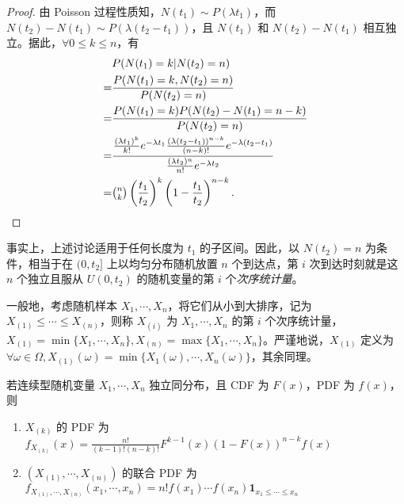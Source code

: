 \documentclass[../main.tex]{subfiles}
\begin{document}
\begin{proof}
    由 Poisson 过程性质知，$N(t_1)\sim P(\lambda t_1)$，而 $N(t_2)-N(t_1)\sim P(\lambda(t_2-t_1))$，且 $N(t_1)$ 和 $N(t_2)-N(t_1)$ 相互独立。据此，$\forall0\leq k\leq n$，有
    \begin{equation*}
        \begin{aligned}
              & P(N(t_1)=k|N(t_2)=n)                                                                                                                                      \\
            = & \frac{P(N(t_1)=k,N(t_2)=n)}{P(N(t_2)=n)}                                                                                                                  \\
            = & \frac{P(N(t_1)=k)P(N(t_2)-N(t_1)=n-k)}{P(N(t_2)=n)}                                                                                                       \\
            = & \frac{\frac{(\lambda t_1)^k}{k!}e^{-\lambda t_1}\frac{(\lambda(t_2-t_1))^{n-k}}{(n-k)!}e^{-\lambda(t_2-t_1)}}{\frac{(\lambda t_2)^n}{n!}e^{-\lambda t_2}} \\
            = & \tbinom nk\left(\frac{t_1}{t_2}\right)^k\left(1-\frac{t_1}{t_2}\right)^{n-k}.                                                                             \\
        \end{aligned}
    \end{equation*}
\end{proof}

事实上，上述讨论适用于任何长度为 $t_1$ 的子区间。因此，以 $N(t_2)=n$ 为条件，相当于在 $(0,t_2]$ 上以均匀分布随机放置 $n$ 个到达点，第 $i$ 次到达时刻就是这 $n$ 个独立且服从 $U(0,t_2)$ 的随机变量的第 $i$ 个\emph{次序统计量}。

一般地，考虑随机样本 $X_1,\cdots,X_n$，将它们从小到大排序，记为 $X_{(1)}\leq\cdots\leq X_{(n)}$，则称 $X_{(i)}$ 为 $X_1,\cdots,X_n$ 的第 $i$ 个次序统计量，$X_{(1)}=\min\{X_1,\cdots,X_n\},X_{(n)}=\max\{X_1,\cdots,X_n\}$。严谨地说，$X_{(1)}$ 定义为 $\forall\omega\in\Omega,X_{(1)}(\omega)=\min\{X_1(\omega),\cdots,X_n(\omega)\}$，其余同理。

\begin{proposition}\label{order_statistic}
    若连续型随机变量 $X_1,\cdots,X_n$ 独立同分布，且 CDF 为 $F(x)$，PDF 为 $f(x)$，则
    \begin{enumerate}
        \item $X_{(k)}$ 的 PDF 为 $f_{X_{(k)}}(x)=\frac{n!}{(k-1)!(n-k)!}F^{k-1}(x)(1-F(x))^{n-k}f(x)$
        \item $(X_{(1)},\cdots,X_{(n)})$ 的联合 PDF 为 $f_{X_{(1)},\cdots,X_{(n)}}(x_1,\cdots,x_n)=n!f(x_1)\cdots f(x_n)\mathbf 1_{x_1\leq\cdots\leq x_n}$
    \end{enumerate}
\end{proposition}
\end{document}
